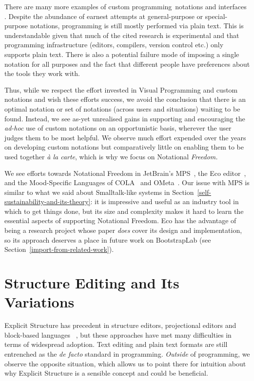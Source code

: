 \documentclass[ twoside,openright,titlepage,numbers=noenddot,headinclude,footinclude,cleardoublepage=empty,abstract=on,
                BCOR=5mm,paper=a4,fontsize=11pt
                ]{scrreprt}
\theoremstyle{definition}
\begin{document}
There are many more examples of custom programming~notations and
interfaces \parencite{VPcodex,VPsurvey,GalleryUIs}. Despite the
abundance of earnest attempts at general-purpose or special-purpose
notations, programming is still mostly performed via plain text. This is
understandable given that much of the cited research is experimental and
that programming infrastructure (editors, compilers, version control
etc.) only supports plain text. There is also a potential failure mode
of imposing a single notation for all purposes and the fact that
different people have preferences about the tools they work with.

Thus, while we respect the effort invested in Visual Programming and
custom notations and wish these efforts success, we avoid the conclusion
that there is an optimal notation or set of notations (across users and
situations) waiting to be found. Instead, we see as-yet unrealised gains
in supporting and encouraging the \emph{ad-hoc} use of custom notations
on an opportunistic basis, wherever the user judges them to be most
helpful. We observe much effort expended over the years on developing
custom notations but comparatively little on enabling them to be used
together \emph{à la carte}, which is why we focus on Notational
\emph{Freedom.}

We see efforts towards Notational Freedom in JetBrain's
MPS~\parencite{MPS}, the Eco editor~\parencite{Eco}, and the
Mood-Specific Languages of \ac{COLA}~\parencite{COLAs} and
OMeta~\parencite{OMeta}. Our issue with MPS is similar to what we said
about Smalltalk-like systems in
Section~\ref{self-sustainability-and-its-theory}: it is impressive and
useful as an industry tool in which to get things done, but its size and
complexity makes it hard to learn the essential aspects of supporting
Notational Freedom. Eco has the advantage of being a research project
whose paper \emph{does} cover its design and implementation, so its
approach deserves a place in future work on BootstrapLab (see
Section~\ref{import-from-related-work}).

\hypertarget{structure-editing-and-its-variations}{\section{Structure Editing and Its
Variations}\label{structure-editing-and-its-variations}}

Explicit Structure has precedent in structure editors, projectional
editors and block-based languages ~\parencite{StrucEd}, but these
approaches have met many difficulties in terms of widespread adoption.
Text editing and plain text formats are still entrenched as the \emph{de
facto} standard in programming. \emph{Outside} of programming, we
observe the opposite situation, which allows us to point there for
intuition about why Explicit Structure is a sensible concept and could
be beneficial.
\end{document}
